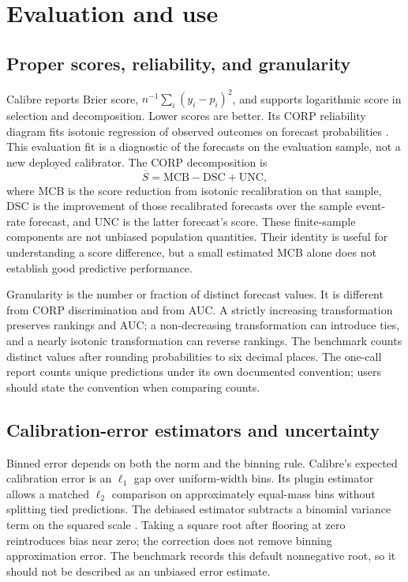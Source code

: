 \documentclass[11pt]{article}
\begin{document}
\section{Evaluation and use}

\subsection{Proper scores, reliability, and granularity}

Calibre reports Brier score, $n^{-1}\sum_i(y_i-p_i)^2$, and supports logarithmic score in selection and decomposition. Lower scores are better. Its CORP reliability diagram fits isotonic regression of observed outcomes on forecast probabilities \citep{dimitriadis2021stable}. This evaluation fit is a diagnostic of the forecasts on the evaluation sample, not a new deployed calibrator. The CORP decomposition is
\[
\overline S=\mathrm{MCB}-\mathrm{DSC}+\mathrm{UNC},
\]
where MCB is the score reduction from isotonic recalibration on that sample, DSC is the improvement of those recalibrated forecasts over the sample event-rate forecast, and UNC is the latter forecast's score. These finite-sample components are not unbiased population quantities. Their identity is useful for understanding a score difference, but a small estimated MCB alone does not establish good predictive performance.

Granularity is the number or fraction of distinct forecast values. It is different from CORP discrimination and from AUC. A strictly increasing transformation preserves rankings and AUC; a non-decreasing transformation can introduce ties, and a nearly isotonic transformation can reverse rankings. The benchmark counts distinct values after rounding probabilities to six decimal places. The one-call report counts unique predictions under its own documented convention; users should state the convention when comparing counts.

\subsection{Calibration-error estimators and uncertainty}

Binned error depends on both the norm and the binning rule. Calibre's expected calibration error is an $\ell_1$ gap over uniform-width bins. Its plugin estimator allows a matched $\ell_2$ comparison on approximately equal-mass bins without splitting tied predictions. The debiased estimator subtracts a binomial variance term on the squared scale \citep{kumar2019verified}. Taking a square root after flooring at zero reintroduces bias near zero; the correction does not remove binning approximation error. The benchmark records this default nonnegative root, so it should not be described as an unbiased error estimate.
\end{document}
